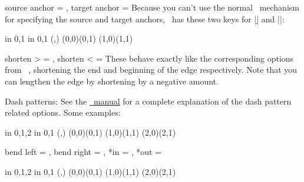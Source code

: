 \begin{sseqdata}[|| name = ex1, cohomological Serre grading]
\begin{keylist}{source anchor = , target anchor = }
Because you can't use the normal \tikzpkg\ mechanism for specifying the source and target anchors, \sseqpages\  has these two keys for |\d| and |\structline|:
\begin{codeexample}[width = 4cm]
\begin{sseqpage}[ no axes, yscale = 1.24 ]
\foreach \x in {0,1} \foreach \y in {0,1} {
    \class(\x,\y)
}
\structline(0,0)(0,1)
\structline[ source anchor = north west, target anchor = -30 ](1,0)(1,1)
\end{sseqpage}
\end{codeexample}
\end{keylist}


\begin{keylist}{shorten > = , shorten < = }
These behave exactly like the corresponding options from \tikzpkg\ , shortening the end and beginning of the edge respectively. Note that you can lengthen the edge by shortening by a negative amount.
\end{keylist}

\begin{manualentry}{Dash patterns:}
See the \href{\pgfmanualurl#subsubsection.15.3.2}{\tikzpkg\  manual} for a complete explanation of the dash pattern related options. Some examples:
\begin{codeexample}[width = 6cm]
\begin{sseqpage}[ no axes, yscale = 1.6 ]
\foreach \x in {0,1,2} \foreach \y in {0,1} {
    \class(\x,\y)
}
(0,0)(0,1)
(1,0)(1,1)
(2,0)(2,1)
\end{sseqpage}
\end{codeexample}
%
\end{manualentry}

\begin{keylist}{bend left = , bend right = , *in = , *out = }
\begin{codeexample}[width = 6cm]
\begin{sseqpage}[no axes,yscale = 1.6]
\foreach \x in {0,1,2} \foreach \y in {0,1} {
    \class(\x,\y)
}
\structline[bend left = 20](0,0)(0,1)
\structline[bend right = 20](1,0)(1,1)
\structline[in = 20,out = north](2,0)(2,1)
\end{sseqpage}
\end{codeexample}
\end{keylist}


\end{sseqdata}
